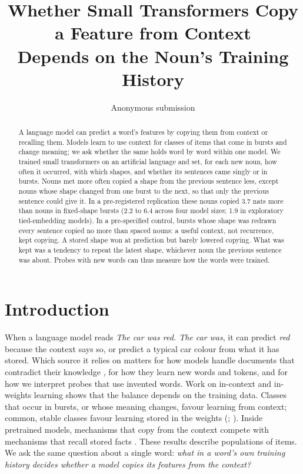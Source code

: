 \documentclass[11pt]{article}
\title{Whether Small Transformers Copy a Feature from Context\\Depends on the Noun's Training History}
\author{Anonymous submission}
\begin{document}
\maketitle

\begin{abstract}
A language model can predict a word's features by copying them from context or recalling them. Models learn to use context for classes of items that come in bursts and change meaning; we ask whether the same holds word by word within one model. We trained small transformers on an artificial language and set, for each new noun, how often it occurred, with which shapes, and whether its sentences came singly or in bursts. Nouns met more often copied a shape from the previous sentence less, except nouns whose shape changed from one burst to the next, so that only the previous sentence could give it. In a pre-registered replication these nouns copied 3.7 nats more than nouns in fixed-shape bursts (2.2 to 6.4 across four model sizes; 1.9 in exploratory tied-embedding models). In a pre-specified control, bursts whose shape was redrawn every sentence copied no more than spaced nouns: a useful context, not recurrence, kept copying. A stored shape won at prediction but barely lowered copying. What was kept was a tendency to repeat the latest shape, whichever noun the previous sentence was about. Probes with new words can thus measure how the words were trained.
\end{abstract}

\section{Introduction}
When a language model reads \emph{The car was red. The car was}, it can predict \emph{red} because the context says so, or predict a typical car colour from what it has stored. Which source it relies on matters for how models handle documents that contradict their knowledge \citep{longpre2021,xie2024}, for how they learn new words and tokens, and for how we interpret probes that use invented words. Work on in-context and in-weights learning shows that the balance depends on the training data. Classes that occur in bursts, or whose meaning changes, favour learning from context; common, stable classes favour learning stored in the weights (\citealp{chan2022}; \citealp{chan2025}). Inside pretrained models, mechanisms that copy from the context compete with mechanisms that recall stored facts \citep{yu2023,jin2024,ortu2024}. These results describe populations of items. We ask the same question about a single word: \emph{what in a word's own training history decides whether a model copies its features from the context?}
\end{document}
